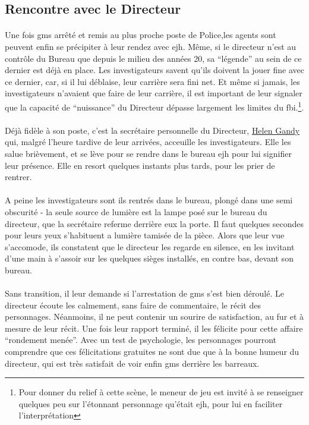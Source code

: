 \subsection{Rencontre avec le Directeur}

\paragraph{} Une fois \gls{gms} arrêté et remis au plus proche poste de Police,les agents sont peuvent enfin se précipiter à leur rendez 
avec \gls{ejh}. Même, si le directeur n'est au contrôle du Bureau que depuis le milieu des années 20, sa ``légende'' au sein de ce dernier
est déjà en place. Les investigateurs savent qu'ils doivent la jouer fine avec ce dernier, car, si il lui déblaise, leur carrière sera
fini net. Et même si jamais, les investigateurs n'avaient que faire de leur carrière, il est important de leur signaler que la capacité
de ``nuissance'' du Directeur dépasse largement les limites du \gls{fbi}.\footnote{Pour donner du relief à cette scène, le meneur de jeu
est invité à se renseigner quelques peu sur l'étonnant personnage qu'était \gls{ejh}, pour lui en faciliter l'interprétation}.

\paragraph{} Déjà fidèle à son poste, c'est la secrétaire personnelle du Directeur, \href{http://en.wikipedia.org/wiki/Helen\_Gandy}{Helen Gandy}
qui, malgré l'heure tardive de leur arrivées, acceuille les investigateurs. Elle les salue brièvement, et se lève pour se rendre dans le 
bureau \gls{ejh} pour lui signifier leur présence. Elle en resort quelques instants plus tards, pour les prier de rentrer.

\paragraph{} A peine les investigateurs sont ils rentrés dans le bureau, plongé dans une semi obscurité - la seule source de lumière est 
la lampe posé sur le bureau du directeur, que la secrétaire referme derrière eux la porte. Il faut quelques secondes pour leurs yeux s'habituent 
a lumière tamisée de la pièce. Alors que leur vue s'accomode, ils constatent que le directeur les regarde en silence, en les invitant d'une
main à s'assoir sur les quelques sièges installés, en contre bas, devant son bureau.

\paragraph{} Sans transition, il leur demande si l'arrestation de \gls{gms} s'est bien déroulé. Le directeur écoute les calmement, sans faire 
de commentaire, le récit des personnages. Néanmoins, il ne peut contenir un sourire de satisfaction, au fur et à mesure de leur récit. Une fois
leur rapport terminé, il les félicite pour cette affaire ``rondement menée''. Avec un test de psychologie, les personnages pourront comprendre
que ces félicitations gratuites ne sont due que à la bonne humeur du directeur, qui est très satisfait de voir enfin \gls{gms} derrière les 
barreaux.

